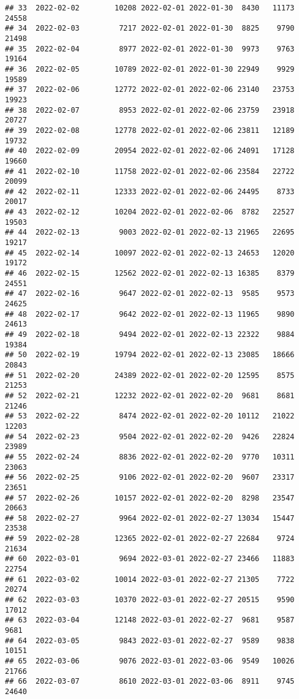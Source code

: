 \documentclass[
]{article}
\begin{document}
\begin{verbatim}
## 33  2022-02-02        10208 2022-02-01 2022-01-30  8430   11173      24558
## 34  2022-02-03         7217 2022-02-01 2022-01-30  8825    9790      21498
## 35  2022-02-04         8977 2022-02-01 2022-01-30  9973    9763      19164
## 36  2022-02-05        10789 2022-02-01 2022-01-30 22949    9929      19589
## 37  2022-02-06        12772 2022-02-01 2022-02-06 23140   23753      19923
## 38  2022-02-07         8953 2022-02-01 2022-02-06 23759   23918      20727
## 39  2022-02-08        12778 2022-02-01 2022-02-06 23811   12189      19732
## 40  2022-02-09        20954 2022-02-01 2022-02-06 24091   17128      19660
## 41  2022-02-10        11758 2022-02-01 2022-02-06 23584   22722      20099
## 42  2022-02-11        12333 2022-02-01 2022-02-06 24495    8733      20017
## 43  2022-02-12        10204 2022-02-01 2022-02-06  8782   22527      19503
## 44  2022-02-13         9003 2022-02-01 2022-02-13 21965   22695      19217
## 45  2022-02-14        10097 2022-02-01 2022-02-13 24653   12020      19172
## 46  2022-02-15        12562 2022-02-01 2022-02-13 16385    8379      24551
## 47  2022-02-16         9647 2022-02-01 2022-02-13  9585    9573      24625
## 48  2022-02-17         9642 2022-02-01 2022-02-13 11965    9890      24613
## 49  2022-02-18         9494 2022-02-01 2022-02-13 22322    9884      19384
## 50  2022-02-19        19794 2022-02-01 2022-02-13 23085   18666      20843
## 51  2022-02-20        24389 2022-02-01 2022-02-20 12595    8575      21253
## 52  2022-02-21        12232 2022-02-01 2022-02-20  9681    8681      21246
## 53  2022-02-22         8474 2022-02-01 2022-02-20 10112   21022      12203
## 54  2022-02-23         9504 2022-02-01 2022-02-20  9426   22824      23989
## 55  2022-02-24         8836 2022-02-01 2022-02-20  9770   10311      23063
## 56  2022-02-25         9106 2022-02-01 2022-02-20  9607   23317      23651
## 57  2022-02-26        10157 2022-02-01 2022-02-20  8298   23547      20663
## 58  2022-02-27         9964 2022-02-01 2022-02-27 13034   15447      23538
## 59  2022-02-28        12365 2022-02-01 2022-02-27 22684    9724      21634
## 60  2022-03-01         9694 2022-03-01 2022-02-27 23466   11883      22754
## 61  2022-03-02        10014 2022-03-01 2022-02-27 21305    7722      20274
## 62  2022-03-03        10370 2022-03-01 2022-02-27 20515    9590      17012
## 63  2022-03-04        12148 2022-03-01 2022-02-27  9681    9587       9681
## 64  2022-03-05         9843 2022-03-01 2022-02-27  9589    9838      10151
## 65  2022-03-06         9076 2022-03-01 2022-03-06  9549   10026      21766
## 66  2022-03-07         8610 2022-03-01 2022-03-06  8911    9745      24640

\end{verbatim}
\end{document}
